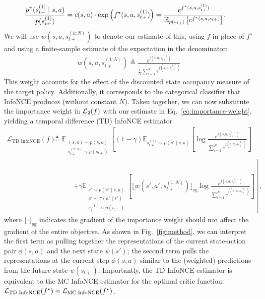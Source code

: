 \documentclass{article} %
\begin{document}
\begin{align}
    \frac{ p^{\pi}(s_{t+}^{(1)} \mid s, a) }{p(s_{t+}^{(1)})} &=  c(s, a) \cdot \exp \left(f^\star(s, a, s_{t+}^{(1)}) \right) = \frac{e^{f^{\star}(s, a, s_{t+}^{(1)})} }{\mathbb{E}_{p(s_{t+})}\left[e^{f^{\star}(s, a, s_{t+})}\right]}.
\end{align}
We will use $w(s, a, s_{t+}^{(1:N)})$ to denote our estimate of this, using $f$ in place of $f^\star$ and using a finite-sample estimate of the expectation in the denominator:
\begin{align}
    w(s, a, s_{t+}^{(1:N)}) \triangleq \frac{e^{f(s, a, s_{t+}^{(1)}) }}{ \frac{1}{N}\sum_{i = 1}^N e^{ f(s, a, s_{t+}^{(i)}) } }
    \label{eq:importance-weight}
\end{align}
This weight accounts for the effect of the discounted state occupancy measure of the target policy. Additionally, it corresponds to the categorical classifier that InfoNCE produces (without constant $N$). Taken together, we can now substitute the importance weight in ${\mathcal{L}}_2(f)$ with our estimate in Eq.~\ref{eq:importance-weight}, yielding a temporal difference (TD) InfoNCE estimator 
\begin{align}
    \mathcal{L}_{\text{TD InfoNCE}}(f) &\triangleq \mathbb{E}_{\substack{ (s, a) \sim p(s, a) \\ s_{t+}^{(2:N)} \sim p(s_{t+}) }} \left[ (1 - \gamma) \mathbb{E}_{s_{t+}^{(1)} \sim p(s' \mid s, a)} \left[ \log \frac{ e^{ f(s, a, s_{t+}^{(1)}) } }{\sum_{i = 1}^N e^{ f(s, a, s_{t+}^{(i)}) }} \right] \right. \nonumber \\
    & \hspace{3em} \left. + \gamma \mathbb{E}_{ \substack{s' \sim p(s' \mid s, a) \\ a' \sim \pi(a' \mid s') \\ s_{t+}^{(1)} \sim p(s_{t+}) }} \left[ \lfloor w(s', a', s_{t+}^{(1:N)}) \rfloor_{\text{sg}} \log \frac{ e^{ f(s, a, s_{t+}^{(1)}) } }{\sum_{i = 1}^N e^{ f(s, a, s_{t+}^{(i)}) }} \right] \right],
    \label{eq:td-infonce}
\end{align}
where $\lfloor \cdot \rfloor_{ \text{sg} }$ indicates the gradient of the importance weight should not affect the gradient of the entire objective. As shown in Fig.~\ref{fig:method}, we can interpret the first term as pulling together the representations of the current state-action pair $\phi(s, a)$ and the next state $\psi(s')$; the second term pulls the representations at the current step $\phi(s, a)$ similar to the (weighted) predictions from the future state $\psi(s_{t+})$. Importantly, the TD InfoNCE estimator is equivalent to the MC InfoNCE estimator for the optimal critic function: ${\mathcal{L}}_{\text{TD InfoNCE}}(f^{\star}) = {\mathcal{L}}_{\text{MC InfoNCE}}(f^{\star})$.
\end{document}
